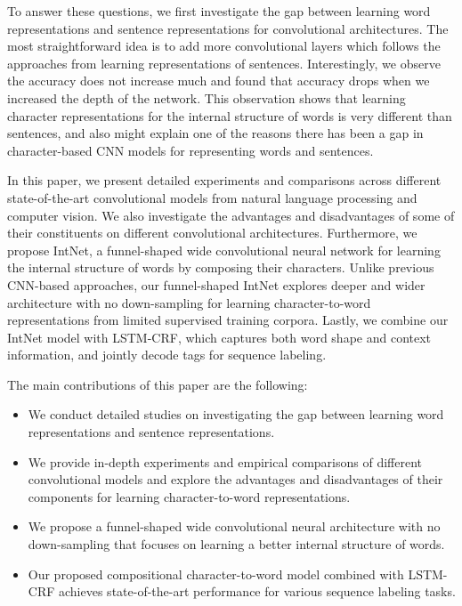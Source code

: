 \documentclass[11pt,a4paper]{article}
\begin{document}
To answer these questions, we first investigate the gap between learning word representations and sentence representations for convolutional architectures. The most straightforward idea is to add more convolutional layers which follows the approaches from learning representations of sentences. Interestingly, we observe the accuracy does not increase much and found that accuracy drops when we increased the depth of the network. This observation shows that learning character representations for the internal structure of words is very different than sentences, and also might explain one of the reasons there has been a gap in character-based CNN models for representing words and sentences.

In this paper, we present detailed experiments and comparisons across different state-of-the-art convolutional models from natural language processing and computer vision. We also investigate the advantages and disadvantages of some of their constituents on different convolutional architectures. Furthermore, we propose IntNet, a funnel-shaped wide convolutional neural network for learning the internal structure of words by composing their characters. Unlike previous CNN-based approaches, our funnel-shaped IntNet explores deeper and wider architecture with no down-sampling for learning character-to-word representations from limited supervised training corpora. Lastly, we combine our IntNet model with LSTM-CRF, which captures both word shape and context information, and jointly decode tags for sequence labeling.

The main contributions of this paper are the following:
\begin{itemize}

\item We conduct detailed studies on investigating the gap between learning word representations and sentence representations.
\item We provide in-depth experiments and empirical comparisons of different convolutional models and explore the advantages and disadvantages of their components for learning character-to-word representations.
\item We propose a funnel-shaped wide convolutional neural architecture with no down-sampling that focuses on learning a better internal structure of words.
\item Our proposed compositional character-to-word model combined with LSTM-CRF achieves state-of-the-art performance for various sequence labeling tasks.

\end{itemize}
\end{document}
